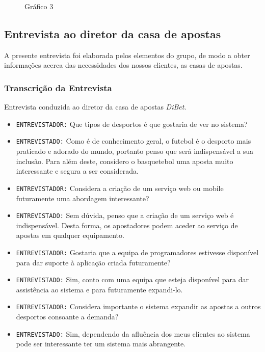 \begin{enumerate}
\begin{figure}[!htb]
            \caption{Gráfico 3 }
        \end{figure}
\end{enumerate}

\subsection{Entrevista ao diretor da casa de apostas}
A presente entrevista foi elaborada pelos elementos do grupo, de modo a obter informações acerca das necessidades dos nossos clientes, as casas de apostas.
\subsubsection{Transcrição da Entrevista}
Entrevista conduzida ao diretor da casa de apostas \textit{DiBet}.
\begin{itemize}
    \item[] \texttt{ENTREVISTADOR:} Que tipos de desportos é que gostaria de ver no sistema?
    \item[] \texttt{ENTREVISTADO:} Como é de conhecimento geral, o futebol é o desporto mais praticado e adorado do mundo, portanto penso que será indispensável a sua inclusão. Para além deste, considero o basquetebol uma aposta muito interessante e segura a ser considerada. 
    
    \item[] \texttt{ENTREVISTADOR:} Considera a criação de um serviço web ou mobile futuramente uma abordagem interessante?
    \item[] \texttt{ENTREVISTADO:} Sem dúvida, penso que a criação de um serviço web é indispensável. Desta forma, os apostadores podem aceder ao serviço de apostas em qualquer equipamento.
    
    \item[] \texttt{ENTREVISTADOR:} Gostaria que a equipa de programadores estivesse disponível para dar suporte à aplicação criada futuramente?
    \item[] \texttt{ENTREVISTADO:} Sim, conto com uma equipa que esteja disponível para dar assistência ao sistema e para futuramente expandi-lo. 
    
    \item[] \texttt{ENTREVISTADOR:} Considera importante o sistema expandir as apostas a outros desportos consoante a demanda?
    \item[] \texttt{ENTREVISTADO:} Sim, dependendo da afluência dos meus clientes ao sistema pode ser interessante ter um sistema mais abrangente.
\end{itemize}

